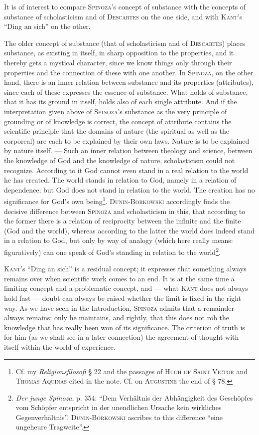 \documentclass[12pt]{article}
\newcommand{\opage}[1]{\marginnote{\footnotesize\textit{[#1]}}}
\begin{document}
It is of interest to compare \textsc{Spinoza}'s concept of substance with the concepts
of substance of scholasticism and of \textsc{Descartes} on the one side, and with
\textsc{Kant}'s ``Ding an sich'' on the other.

The older concept of substance (that of scholasticism and of \textsc{Descartes})
places substance, as existing in itself, in sharp opposition to the properties, and
it thereby gets a mystical character, since we know things only through their
properties and the connection of these with one another. In \textsc{Spinoza}, on
the other hand, there is an inner relation between substance and its properties
(attributes), since each of these expresses the essence of substance. What holds of
substance, that it has its ground in itself, holds also of each single attribute.
And if the interpretation given above of \textsc{Spinoza}'s substance as the very
principle of grounding or of knowledge is correct, the concept of attribute contains
the scientific principle that the domains of nature (the spiritual as well as the
corporeal) are each to be explained by their own laws. Nature is to be explained by
nature itself. --- Such an inner relation between theology and science, between the
knowledge of God and the knowledge of nature, scholasticism could not recognize.
According to it God cannot even stand in a real relation to the world he has
\opage{21}created. The world stands in relation to God, namely in a relation of
dependence; but God does not stand in relation to the world. The creation has no
significance for God's own being\footnote{Cf. my \textit{Religionsfilosofi} § 22 and
the passages of \textsc{Hugh of Saint Victor} and \textsc{Thomas Aquinas} cited in the
note. Cf. on \textsc{Augustine} the end of § 78.}. \textsc{Dunin-Borkowski} accordingly
finds the decisive difference between \textsc{Spinoza} and scholasticism in this, that
according to the former there is a relation of reciprocity between the infinite and
the finite (God and the world), whereas according to the latter the world does indeed
stand in a relation to God, but only by way of analogy (which here really means:
figuratively) can one speak of God's standing in relation to the
world\footnote{\textit{Der junge Spinoza}, p. 354: ``Dem Verhältnis der Abhängigkeit
des Geschöpfes vom Schöpfer entspricht in der unendlichen Ursache kein wirkliches
Gegenverhältnis''. \textsc{Dunin-Borkowski} ascribes to this difference ``eine
ungeheure Tragweite''.}.

\textsc{Kant}'s ``Ding an sich'' is a residual concept; it expresses that something
always remains over when scientific work comes to an end. It is at the same time a
limiting concept and a problematic concept, and --- what \textsc{Kant} does not always
hold fast --- doubt can always be raised whether the limit is fixed in the right way.
As we have seen in the Introduction, \textsc{Spinoza} admits that a remainder always
remains; only he maintains, and rightly, that this does not rob the knowledge that has
really been won of its significance. The criterion of truth is for him (as we shall
see in a later connection) the agreement of thought with itself within the world of
experience.
\end{document}

